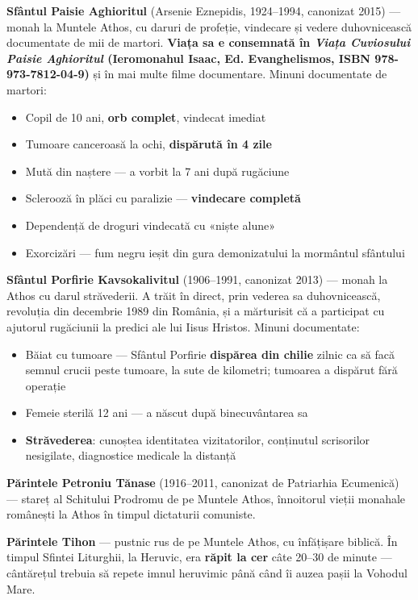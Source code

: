 \documentclass[12pt,a4paper,twoside,openany]{book}
\begin{document}
\textbf{Sfântul Paisie Aghioritul} (Arsenie Eznepidis, 1924–1994, canonizat 2015) — monah la Muntele Athos, cu daruri de profeție, vindecare și vedere duhovnicească documentate de mii de martori. \textbf{Viața sa e consemnată în \textit{Viața Cuviosului Paisie Aghioritul} (Ieromonahul Isaac, Ed. Evanghelismos, ISBN 978-973-7812-04-9)} și în mai multe filme documentare. Minuni documentate de martori:

\begin{itemize}
  \item Copil de 10 ani, \textbf{orb complet}, vindecat imediat
  \item Tumoare canceroasă la ochi, \textbf{dispărută în 4 zile}
  \item Mută din naștere — a vorbit la 7 ani după rugăciune
  \item Sclerooză în plăci cu paralizie — \textbf{vindecare completă}
  \item Dependență de droguri vindecată cu «niște alune»
  \item Exorcizări — fum negru ieșit din gura demonizatului la mormântul sfântului
\end{itemize}
\textbf{Sfântul Porfirie Kavsokalivitul} (1906–1991, canonizat 2013) — monah la Athos cu darul străvederii. A trăit în direct, prin vederea sa duhovnicească, revoluția din decembrie 1989 din România, și a mărturisit că a participat cu ajutorul rugăciunii la predici ale lui Iisus Hristos. Minuni documentate:

\begin{itemize}
  \item Băiat cu tumoare — Sfântul Porfirie \textbf{dispărea din chilie} zilnic ca să facă semnul crucii peste tumoare, la sute de kilometri; tumoarea a dispărut fără operație
  \item Femeie sterilă 12 ani — a născut după binecuvântarea sa
  \item \textbf{Străvederea}: cunoștea identitatea vizitatorilor, conținutul scrisorilor nesigilate, diagnostice medicale la distanță
\end{itemize}
\textbf{Părintele Petroniu Tănase} (1916–2011, canonizat de Patriarhia Ecumenică) — stareț al Schitului Prodromu de pe Muntele Athos, înnoitorul vieții monahale românești la Athos în timpul dictaturii comuniste.

\textbf{Părintele Tihon} — pustnic rus de pe Muntele Athos, cu înfățișare biblică. În timpul Sfintei Liturghii, la Heruvic, era \textbf{răpit la cer} câte 20–30 de minute — cântărețul trebuia să repete imnul heruvimic până când îi auzea pașii la Vohodul Mare.
\end{document}

